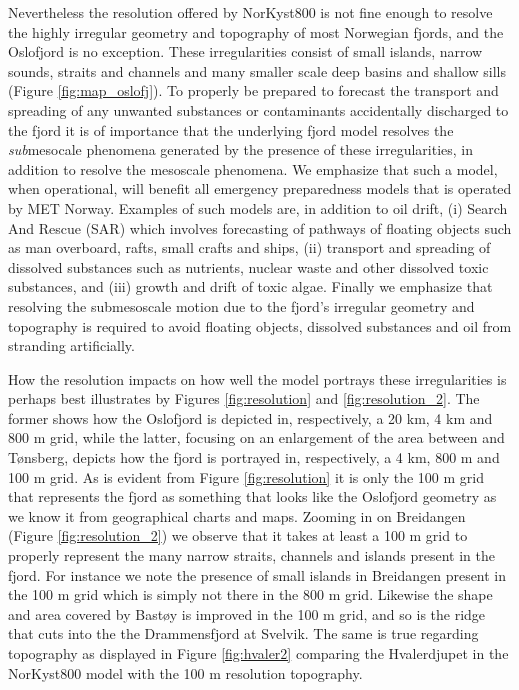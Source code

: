 Nevertheless the resolution offered by NorKyst800 is not fine enough to resolve the highly irregular geometry and topography of most Norwegian fjords, and the Oslofjord is no exception. These irregularities consist of small islands, narrow sounds, straits and channels and many smaller scale deep basins and shallow sills (Figure \ref{fig:map_oslofj}). To properly be prepared to forecast the transport and spreading of any unwanted substances or contaminants accidentally discharged to the fjord it is of importance that the underlying fjord model resolves the \emph{sub}mesocale phenomena generated by the presence of these irregularities, in addition to resolve the mesoscale phenomena. We emphasize that such a model, when operational, will benefit all emergency preparedness models that is operated by MET Norway. Examples of such models are, in addition to oil drift, (i) Search And Rescue (SAR) which involves forecasting of pathways of floating objects such as man overboard, rafts, small crafts and ships, (ii) transport and spreading of dissolved substances such as nutrients, nuclear waste and other dissolved toxic substances, and (iii) growth and drift of toxic algae. Finally we emphasize that resolving the submesoscale motion due to the fjord's irregular geometry and topography is required to avoid floating objects, dissolved substances and oil from stranding artificially.  

How the resolution impacts on how well the model portrays these irregularities is perhaps best illustrates by Figures \ref{fig:resolution} and \ref{fig:resolution_2}. The former shows how the Oslofjord is depicted in, respectively, a 20 km, 4 km and 800 m grid, while the latter, focusing on an enlargement of the area between {\DR} and T{\o}nsberg, depicts how the fjord is portrayed in, respectively, a 4 km, 800 m and 100 m grid. As is evident from Figure \ref{fig:resolution} it is only the 100 m grid that represents the fjord as something that looks like the Oslofjord geometry as we know it from geographical charts and maps. Zooming in on Breidangen (Figure \ref{fig:resolution_2}) we observe that it takes at least a 100 m grid to properly represent the many narrow straits, channels and islands present in the fjord. For instance we note the presence of small islands in Breidangen present in the 100 m grid which is simply not there in the 800 m grid. Likewise the shape and area covered by Bast{\o}y is improved in the 100 m grid, and so is the ridge that cuts into the the Drammensfjord at Svelvik. The same is true regarding topography as displayed in Figure \ref{fig:hvaler2} comparing the Hvalerdjupet in the NorKyst800 model with the 100 m resolution topography. 


